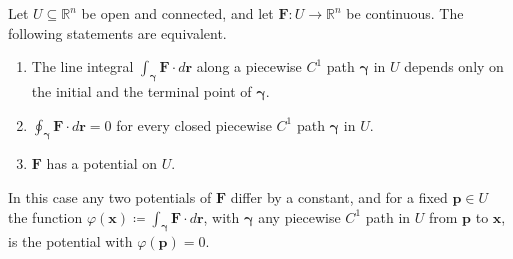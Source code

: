 \begin{theorem}
\label{thm:path-independence}
Let $U\subseteq\mathbb R^n$ be open and connected, and let $\mathbf F\colon U\to\mathbb R^n$ be continuous. The following statements are equivalent.
\begin{enumerate}
\item The line integral $\int_{\boldsymbol\gamma}\mathbf F\cdot d\mathbf r$ along a piecewise $C^1$ path $\boldsymbol\gamma$ in $U$ depends only on the initial and the terminal point of $\boldsymbol\gamma$.
\item $\oint_{\boldsymbol\gamma}\mathbf F\cdot d\mathbf r=0$ for every closed piecewise $C^1$ path $\boldsymbol\gamma$ in $U$.
\item $\mathbf F$ has a potential on $U$.
\end{enumerate}
In this case any two potentials of $\mathbf F$ differ by a constant, and for a fixed $\mathbf p\in U$ the function $\varphi(\mathbf x)\coloneqq\int_{\boldsymbol\gamma}\mathbf F\cdot d\mathbf r$, with $\boldsymbol\gamma$ any piecewise $C^1$ path in $U$ from $\mathbf p$ to $\mathbf x$, is the potential with $\varphi(\mathbf p)=0$.
\end{theorem}

